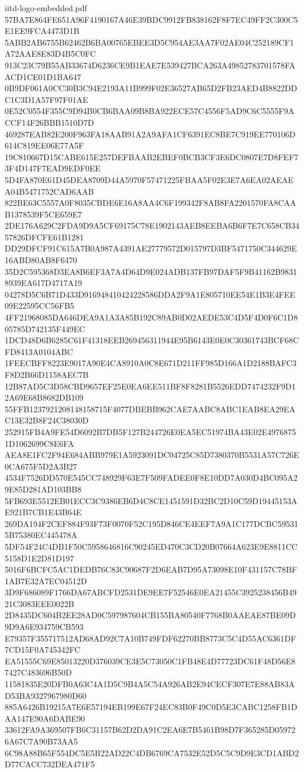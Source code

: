 \begin{filecontents*}[overwrite]{iitd-logo-embedded.pdf}
57BA7E864FE651A96F4190167A46E39BDC9912FB838162F8F7EC49FF2C300C5E1EE9FCA4473D1B
5ABB2AB6755B62462B6BA00765EBEE3D5C954AE3AA7F02AE04C252189CF1A72AAE8E83D4B5C0FC
913C23C79B55AB33674D6236CE9B1EAE7E539427BCA263A49852783701578FAACD1CE01D1BA647
0B9DF061A0CC30B3C94E2193A11B999F02E36527AB65D2FB23AED4B8822DDC1C3D1A57F97F01AE
0E52C0554F355C9D94B0CB6BAA09B8BA922ECE57C4556F5AD9C6C5555F9ACCF14F26BBB1510D7D
469287EAB82E200F963FA18AAB91A2A9AFA1CF6391EC8BE7C919EE770106D614C819EE06E77A5F
19C810667D15CABE615E257DEFBAAB2EBEF0BCB3CF3E6DC0807E7D8FEF73F4D147F7EAD9EDF0EE
5D4FA870E61D45DEA8709D44A5970F57471225FBAA5F02E3E7A6EA02AEAEA04B5471752CAD6AAB
822BE63C5557A0F8035CBDE6E16A8AA4C6F199342F8AB8FA2201570FA8CAAB1378539F5CE659E7
2DE176A629C2FDA9D9A5CF69175C78E1902143AEB8EEBA6B6F7E7C658CB3457826DFCFE61B1281
DD29DFCF91C615A7B0A987A4391AE27779572D015797D3BF5471750C344629E16ABD80AB8F6470
35D2C595368D3EA8B6EF3A7A4D64D9E024ADB137FB97DAF5F9B41162B98318939EA617D4717A19
04278D5C6B71D433D916948410424228586DDA2F9A1E805710EE54E1B3E4FEE09E22595CC56FB5
4FF21968085DA646DEA9A1A3A85B192C89AB0D02AEDE53C4D5F4D0F6C1D805785D742135F449EC
1DCD48D6B6285C61F41318EEB269456311944E95B6143E0E0C30361743BCF68CFD8413A0104ABC
1FEECBFF8223E9017A90E4CA8910A0C8E671D211FF985D166A1D2188BAFC3F8D2B66D1158AEC7B
12B87AD5C3D58CBD9657EF25E0EA6EE511BF8F8281B5526EDD7474232F9D12A69E68B8682DB109
55FFB1237921208148158715F4077DBEBB962CAE7AABC8ABC1EAB8EA29EAC13E32B8F24C38030D
252915FB4A9FE54D6092B7DB5F127B244726E0EA5EC51974BA43E02E49768751D1062699C8E6FA
AEA8E1FC2F94E684ABB979E1A5923091DC04725C85D7380370B5531A57C726E0CA675F5D2A3B27
4534F7526DD570E545CC748929F63E7F509FADEE0F8E10DD7A030D4BC095A29E85D281AD103BB8
5FB693E5512EB01ECC3C9386EB6D4C8CE1451591D32BC2D10C59D19445153AE921B7CB1E43B64E
269DA194F2CEF884F93F73F0070F52C195D846CE4EEF7A9A1C177DCBC595315B75380EC445478A
5DF54F24C4DB1F50C5958646816C90245ED470C3CD20B07664A623E9E8811CC5158D1E2D81D197
5016F6BCFC5AC1DEDB76C83C90687F2D6EAB7D95A73098E10F431157C78BF1AB7E32A7EC04512D
3D9F686089F1766DA67ABCFD2531DE9EE7F52546E0EA21455C3925238456B4921C3083EEE0022B
2D8435DC604B2EE28AD0C597987604CB155BA80540F7768B0AAEAE87BE09D9D9A6E934759CB593
E79357F355717512AD68AD92C7A10B749FDF62270BB8773C5C4D55AC6361DF7CD15F0A745342FC
EA51555C69E85013220D376039CE3E5C73050C1FB48E4D77723DC61F48D56E87427C483696B50D
11581835E20DFB0A63C4A1D5C9B4A5C54A926AB2E94CECF307E7E88AB83AD53BA9327967980D60
885A6426B19215A7E6E57194EB199E67F24EC83B0F49C0D5E3CABC1258FB1DAA147E90A6DABE90
33612FA9A369507FB6C31157B62D2DA91C2EA6E7B5461B98D7F365285D059726A67C7A90B73AA5
6C98A88B65F554DC5E5B22AD22C4DB6769CA7532E52D5C5C9D9E3CD1ABD2D77CACC732DEA471F5

\end{filecontents*}
